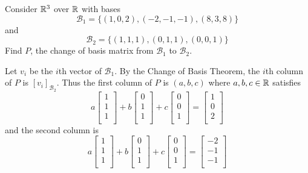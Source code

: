 \documentclass{article}
\begin{document}
\begin{example}
  Consider $\mathbb{R}^3$ over $\mathbb{R}$ with bases
  \[
    \mathcal{B}_1 = \{(1, 0, 2), (-2, -1, -1), (8, 3, 8)\}
  \] and \[
    \mathcal{B}_2 = \{(1, 1, 1), (0, 1, 1), (0, 0, 1)\}
  \]
  Find $P$, the change of basis matrix from $\mathcal{B}_1$ to $\mathcal{B}_2$.

  Let $v_i$ be the $i$th vector of $\mathcal{B}_1$. By the Change of Basis Theorem, the $i$th column of $P$ is $[v_i]_{\mathcal{B}_2}$. Thus the first column of $P$ is $(a, b, c)$ where $a, b, c \in \mathbb{R}$ satisfies \[
    a
    \begin{bmatrix}
      1\\1\\1\\
    \end{bmatrix}+b
    \begin{bmatrix}
      0\\1\\1\\
    \end{bmatrix} + c
    \begin{bmatrix}
      0\\0\\1\\
    \end{bmatrix} =
    \begin{bmatrix}
      1\\0\\2\\
    \end{bmatrix}
  \] and the second column is \[
    a
    \begin{bmatrix}
      1\\1\\1\\
    \end{bmatrix}+b
    \begin{bmatrix}
      0\\1\\1\\
    \end{bmatrix} + c
    \begin{bmatrix}
      0\\0\\1\\
    \end{bmatrix} =
    \begin{bmatrix}
      -2\\-1\\-1\\

\end{bmatrix}\]
\end{example}
\end{document}
